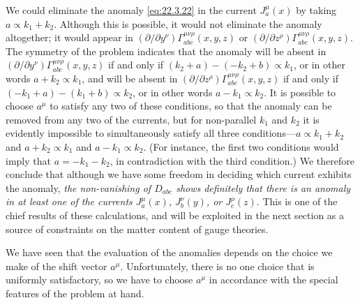 We could eliminate the anomaly \eqref{eq:22.3.22} in the current
$J_a^\mu(x)$ by taking $a\propto k_1+k_2$. Although this is possible,
it would not eliminate the anomaly altogether; it would appear in
$(\partial/\partial y^\nu)\Gamma_{abc}^{\mu\nu\rho}(x,y,z)$
or
$(\partial/\partial z^\rho)\Gamma_{abc}^{\mu\nu\rho}(x,y,z)$.
The symmetry of the problem indicates that the anomaly will be absent in
$(\partial/\partial y^\nu)\Gamma_{abc}^{\mu\nu\rho}(x,y,z)$
if and only if $(k_2+a)-(-k_2+b)\propto k_1$, or in other words
$a+k_2\propto k_1$, and will be absent in
$(\partial/\partial z^\rho)\Gamma_{abc}^{\mu\nu\rho}(x,y,z)$
if and only if $(-k_1+a)-(k_1+b)\propto k_2$, or in other words
$a-k_1\propto k_2$. It is possible to choose $a^\mu$ to satisfy any two of
these conditions, so that the anomaly can be removed from any two of the
currents, but for non-parallel $k_1$ and $k_2$ it is evidently impossible
to simultaneously satisfy all three conditions---$a\propto k_1+k_2$ and
$a+k_2\propto k_1$ and $a-k_1\propto k_2$. (For instance, the first two
conditions would imply that $a=-k_1-k_2$, in contradiction with the third
condition.) We therefore conclude that although we have some freedom in
deciding which current exhibits the anomaly, \emph{the non-vanishing of
$D_{abc}$ shows definitely that there is an anomaly in at
least one of the currents $J_a^\mu(x)$, $J_b^\nu(y)$, or
$J_c^\rho(z)$}. This is one of the chief results of these
calculations, and will be exploited in the next section as a source of
constraints on the matter content of gauge theories.

We have seen that the evaluation of the anomalies depends on the choice we
make of the shift vector $a^\mu$. Unfortunately, there is no one choice
that is uniformly satisfactory, so we have to choose $a^\mu$ in accordance
with the special features of the problem at hand.

